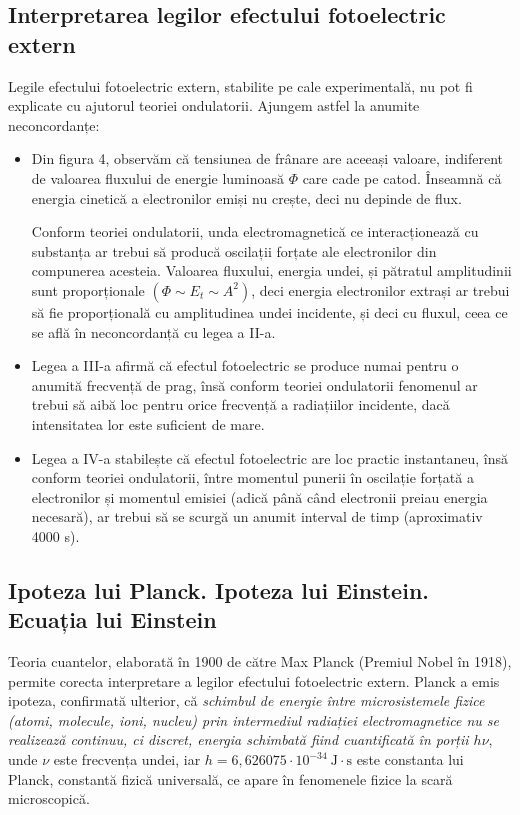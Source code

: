 \subsection{Interpretarea legilor efectului fotoelectric extern}

Legile efectului fotoelectric extern, stabilite pe cale experimentală, nu pot fi
explicate cu ajutorul teoriei ondulatorii. Ajungem astfel la anumite neconcordanțe:

\begin{itemize}
    \item Din figura 4, observăm că tensiunea de frânare are aceeași valoare,
        indiferent de valoarea fluxului de energie luminoasă $\Phi$ care cade
        pe catod. Înseamnă că energia cinetică a electronilor emiși nu crește,
        deci nu depinde de flux.

        Conform teoriei ondulatorii, unda electromagnetică ce interacționează
        cu substanța ar trebui să producă oscilații forțate ale electronilor
        din compunerea acesteia. Valoarea fluxului, energia undei, și pătratul
        amplitudinii sunt proporționale \( (\Phi \sim E_t \sim A^2) \),
        deci energia electronilor extrași ar trebui să fie proporțională cu
        amplitudinea undei incidente, și deci cu fluxul, ceea ce se află în
        neconcordanță cu legea a II-a.

    \item Legea a III-a afirmă că efectul fotoelectric se produce numai pentru
        o anumită frecvență de prag, însă conform teoriei ondulatorii fenomenul
        ar trebui să aibă loc pentru orice frecvență a radiațiilor incidente,
        dacă intensitatea lor este suficient de mare.

    \item Legea a IV-a stabilește că efectul fotoelectric are loc practic
        instantaneu, însă conform teoriei ondulatorii, între momentul punerii
        în oscilație forțată a electronilor și momentul emisiei (adică până
        când electronii preiau energia necesară), ar trebui să se scurgă un
        anumit interval de timp (aproximativ 4000 s).
\end{itemize}

\subsection{Ipoteza lui Planck. Ipoteza lui Einstein. Ecuația lui Einstein}

Teoria cuantelor, elaborată în 1900 de către Max Planck (Premiul Nobel în
1918), permite corecta interpretare a legilor efectului fotoelectric extern.
Planck a emis ipoteza, confirmată ulterior, că \emph{schimbul de energie între
microsistemele fizice (atomi, molecule, ioni, nucleu) prin intermediul
radiației electromagnetice nu se realizează continuu, ci discret, energia
schimbată fiind cuantificată în porții $h\nu$}, unde $\nu$ este frecvența
undei, iar \( h = 6,626075 \cdot 10^{-34} ~ \mathrm{J \cdot s} \) este
constanta lui Planck, constantă fizică universală, ce apare în fenomenele
fizice la scară microscopică.

